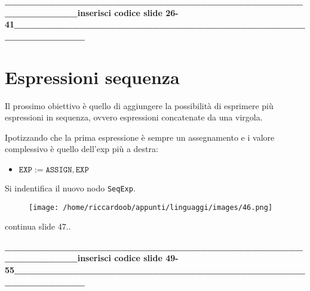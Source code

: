 \textbf{\_\_\_\_\_\_\_\_\_\_\_\_\_\_\_\_\_\_\_\_\_\_\_\_\_\_\_\_\_\_\_\_\_\_\_\_\_\_\_\_\_\_\_\_\_\_\_\_\_\_\_inserisci codice slide 26-41\_\_\_\_\_\_\_\_\_\_\_\_\_\_\_\_\_\_\_\_\_\_\_\_\_\_\_\_\_\_\_\_\_\_\_\_\_\_\_\_\_\_\_\_\_\_\_\_\_\_\_}

\section{Espressioni sequenza}
Il prossimo obiettivo è quello di aggiungere la possibilità di esprimere più espressioni in sequenza, ovvero espressioni concatenate da una virgola.

Ipotizzando che la prima espressione è sempre un assegnamento e i valore complessivo è quello dell'exp più a destra:
\begin{itemize}[label={}]
    \item $\texttt{EXP} := \texttt{ASSIGN}, \texttt{EXP}$
\end{itemize}

Si indentifica il nuovo nodo \texttt{SeqExp}.
\begin{figure}[H]
    \centering
    \texttt{[image: /home/riccardoob/appunti/linguaggi/images/46.png]}
\end{figure}

continua slide 47..


\textbf{\_\_\_\_\_\_\_\_\_\_\_\_\_\_\_\_\_\_\_\_\_\_\_\_\_\_\_\_\_\_\_\_\_\_\_\_\_\_\_\_\_\_\_\_\_\_\_\_\_\_\_inserisci codice slide 49-55\_\_\_\_\_\_\_\_\_\_\_\_\_\_\_\_\_\_\_\_\_\_\_\_\_\_\_\_\_\_\_\_\_\_\_\_\_\_\_\_\_\_\_\_\_\_\_\_\_\_\_}








































